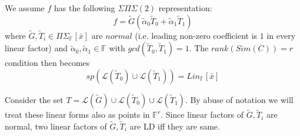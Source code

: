 \documentclass[letterpaper,USenglish,numberwithinsect]{lipics}
\newcommand{\F}{\mathbb{F}}
\newcommand{\ML}{\mathcal{L}}
\newcommand{\B}[1]{\bar{#1}}
\begin{document}
We assume $f$ has the following
$\Sigma\Pi\Sigma(2)$ representation:
\[
f = \tilde G(\tilde \alpha_0\tilde T_0 + \tilde \alpha_1\tilde T_1)
\]
where $\tilde G,\tilde T_i\in\Pi\Sigma_\F[\B{x}]$ are $normal$ (i.e. leading non-zero coefficient is $1$ in every linear factor)
and $\tilde \alpha_0,\tilde \alpha_1\in \F$ with $gcd(\tilde T_0,\tilde T_1)=1$. The $rank(Sim(C))=r$ condition then becomes
\[
 sp(\ML(\tilde T_0)\cup \ML(\tilde T_1)) = Lin_\F[\B{x}]
\]

Consider the set $T = \ML(\tilde G)\cup\ML(\tilde T_0)\cup \ML(\tilde T_1)$. By abuse of
notation we will treat these linear forms also as points in $\F^r$. Since linear factors of $\tilde G, \tilde T_i$ are normal,
two linear factors of $\tilde G, \tilde T_i$ are LD iff they are same.\\
\end{document}
